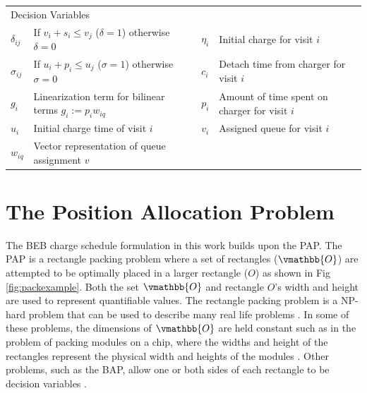 \documentclass[letterpaper, 10pt, conference]{IEEEtran}
\begin{document}
\begin{table}[!t]
\begin{tabular}{l l l l}
		\hline
		\multicolumn{4}{l}{Decision Variables} \\
			$\delta_{ij}$ & If $v_i + s_i \leq v_j$ (\(\delta = 1\)) otherwise \(\delta = 0\)   &
			$\eta_i$      & Initial charge for visit $i$                                        \\
			$\sigma_{ij}$ & If \(u_i + p_i \leq u_j\) (\(\sigma = 1\)) otherwise \(\sigma = 0\) &
			$c_i$         & Detach time from charger for visit $i$                              \\
			$g_i$         & Linearization term for bilinear terms $g_i := p_i w_{iq}$           &
			$p_i$         & Amount of time spent on charger for visit $i$                       \\
			$u_i$         & Initial charge time of visit $i$                                    &
			$v_i$         & Assigned queue for visit $i$                                        \\
			$w_{iq}$      & Vector representation of queue assignment \(v\)                     \\
			\bottomrule
	\end{tabular}
\end{table}

\section{The Position Allocation Problem}
\label{sec:positionallocationproblem}
The BEB charge schedule formulation in this work builds upon the PAP. The PAP is a rectangle packing problem where a set of rectangles (\(\vmathbb{O}\)) are attempted to be optimally placed in a larger rectangle (\(O\)) as shown in Fig \ref{fig:packexample}. Both the set \(\vmathbb{O}\) and rectangle \(O\)'s width and height are used to represent quantifiable values. The rectangle packing problem is a NP-hard problem that can be used to describe many real life problems \cite{Bruin2013,Murata1995}. In some of these problems, the dimensions of \(\vmathbb{O}\) are held constant such as in the problem of packing modules on a chip, where the widths and height of the rectangles represent the physical width and heights of the modules \cite{Murata1995}. Other problems, such as the BAP, allow one or both sides of each rectangle to be decision variables \cite{Buhrkal2010}.

\end{document}
